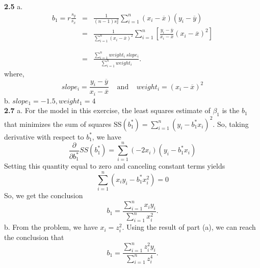 \textbf{2.5} a.
\begin{eqnarray*} b_1 =
r\frac{s_{y}}{s_{x}} &=& \frac{1}{(n-1)s_{x}^{2}}\sum_{i=1}^n\left(
x_{i}-\overline{x}\right) \left( y_{i}-\overline{y}\right)  \\
&=& \frac{1}{\sum_{i=1}^n\left(
x_{i}-\overline{x}\right)^{2}}\sum_{i=1}^n\left[\frac{y_{i}-\overline{y}}{x_{i}-\overline{x}}\left(
x_{i}-\overline{x}\right)^2\right]\\
&& \\
&&\\
&=& \frac{\sum_{i=1}^nweight_i~slope_i}{\sum_{i=1}^nweight_{i}}.
\end{eqnarray*}
where, \begin{equation*}
slope_i=\frac{y_{i}-\overline{y}}{x_{i}-\overline{x}}~~~~~\mathrm{and}~~~~~weight_i=\left(
x_{i}-\overline{x}\right)^2
\end{equation*}
b. $slope_1=-1.5, weight_1=4$\\

\textbf{2.7} a. For the model in this exercise, the least squares
estimate of $\beta_1$ is the $b_1$ that minimizes the sum of squares
$\mathrm{SS}(b_1^{\ast} )=\sum_{i=1}^n\left( y_i - b_1^{\ast
}x_i\right) ^{2}.$ So, taking derivative with respect to
$b_1^{\ast}$, we have
\begin{equation*}
\frac{\partial }{\partial b_1^{\ast }}SS(b_1^{\ast
})=\sum_{i=1}^n(-2x_{i})\left( y_{i}-b_1^{\ast }x_{i}\right)
\end{equation*}
Setting this quantity
equal to zero and canceling constant terms yields
\begin{equation*}
\sum_{i=1}^n\left(x_{i}y_{i}-b_1^{\ast }x_{i}^2\right) =0
\end{equation*}
So, we get the conclusion
\begin{equation*}
b_1 = \frac{\sum_{i=1}^n x_i y_i}{\sum_{i=1}^nx_i^{2}}.
\end{equation*}
b. From the problem, we have $x_i = z_i^2$. Using the result of part
(a), we can reach the conclusion that
\begin{equation*}
b_1 = \frac{\sum_{i=1}^n z_i^2 y_i}{\sum_{i=1}^nz_i^{4}}.
\end{equation*}\\

